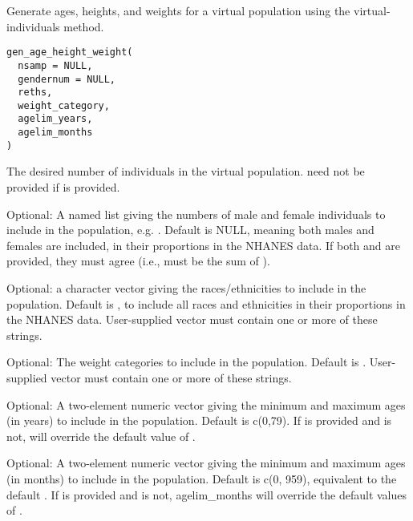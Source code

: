 \documentclass[a4paper]{book}
\begin{document}
%
\begin{Description}\relax
Generate ages, heights, and weights for a virtual population using the 
virtual-individuals method.
\end{Description}
%
\begin{Usage}
\begin{verbatim}
gen_age_height_weight(
  nsamp = NULL,
  gendernum = NULL,
  reths,
  weight_category,
  agelim_years,
  agelim_months
)
\end{verbatim}
\end{Usage}
%
\begin{Arguments}
\begin{ldescription}
\item[\code{nsamp}] The desired number of individuals in the virtual population. 
 need not be provided if  is provided.

\item[\code{gendernum}] Optional: A named list giving the numbers of male and female 
individuals to include in the population, e.g. . Default is NULL, meaning both males and females are included, 
in their proportions in the NHANES data. If both  and 
 are provided, they must agree (i.e.,  must be
the sum of ).

\item[\code{reths}] Optional: a character vector giving the races/ethnicities to 
include in the population. Default is , to include 
all races and ethnicities in their proportions in the NHANES data. 
User-supplied vector must contain one or more of these strings.

\item[\code{weight\_category}] Optional: The weight categories to include in the 
population. Default is . User-supplied vector must contain one or more of these strings.

\item[\code{agelim\_years}] Optional: A two-element numeric vector giving the minimum 
and maximum ages (in years) to include in the population. Default is 
c(0,79). If  is provided and  is not,
 will override the default value of .

\item[\code{agelim\_months}] Optional: A two-element numeric vector giving the minimum
and maximum ages (in months) to include in the population. Default is c(0, 
959), equivalent to the default . If 
is provided and  is not, agelim\_months will override the 
default values of .
\end{ldescription}
\end{Arguments}
\end{document}

